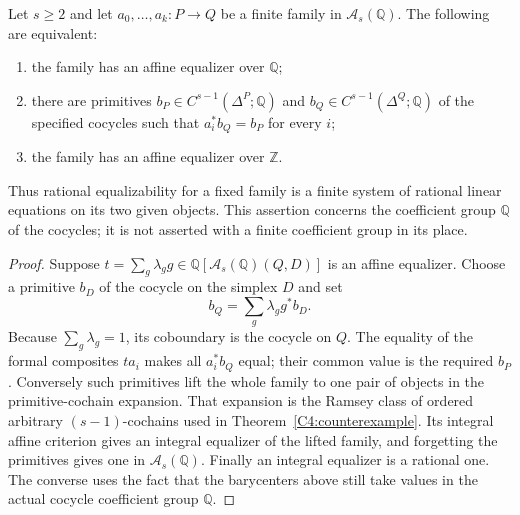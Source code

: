 \begin{proposition}
\label{C4:rational-primitive-criterion}
Let $s\geq2$ and let $a_0,\ldots,a_k:P\to Q$ be a finite family
in $\mathcal A_s(\mathbb Q)$. The following are equivalent:
\begin{enumerate}
\item the family has an affine equalizer over $\mathbb Q$;
\item there are primitives $b_P\in C^{s-1}(\Delta^P;\mathbb Q)$
and $b_Q\in C^{s-1}(\Delta^Q;\mathbb Q)$ of the specified cocycles
such that $a_i^*b_Q=b_P$ for every $i$;
\item the family has an affine equalizer over $\mathbb Z$.
\end{enumerate}
Thus rational equalizability for a fixed family is a finite system
of rational linear equations on its two given objects. This
assertion concerns the coefficient group $\mathbb Q$ of the
cocycles; it is not asserted with a finite coefficient group in its
place.
\end{proposition}
\begin{proof}
Suppose $t=\sum_g\lambda_g g\in
\mathbb Q[\mathcal A_s(\mathbb Q)(Q,D)]$ is an affine equalizer.
Choose a primitive $b_D$ of the cocycle on the simplex $D$ and set
\[
 b_Q=\sum_g\lambda_g g^*b_D.
\]
Because $\sum_g\lambda_g=1$, its coboundary is the cocycle on
$Q$. The equality of the formal composites $ta_i$ makes all
$a_i^*b_Q$ equal; their common value is the required $b_P$.
Conversely such primitives lift the whole family to one pair of
objects in the primitive-cochain expansion. That expansion is the
Ramsey class of ordered arbitrary $(s-1)$-cochains used in
Theorem~\ref{C4:counterexample}. Its integral affine criterion gives
an integral equalizer of the lifted family, and forgetting the
primitives gives one in $\mathcal A_s(\mathbb Q)$. Finally an
integral equalizer is a rational one. The converse uses the fact
that the barycenters above still take values in the actual cocycle
coefficient group $\mathbb Q$.
\end{proof}

